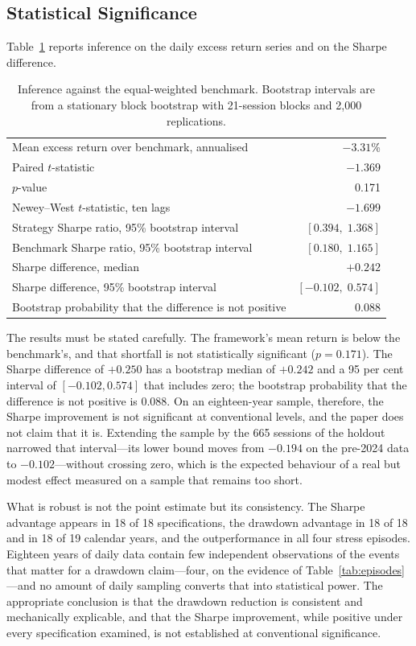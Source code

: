 \subsection{Statistical Significance}

Table~\ref{tab:inference} reports inference on the daily excess return series and on the Sharpe
difference.

\begin{table}[!ht]
\centering
\caption{Inference against the equal-weighted benchmark. Bootstrap intervals are from a
stationary block bootstrap with 21-session blocks and 2{,}000 replications.}
\label{tab:inference}
\small
\begin{tabular}{p{6.4cm}r}
\hline
Mean excess return over benchmark, annualised & $-3.31$\% \\
Paired $t$-statistic & $-1.369$ \\
$p$-value & 0.171 \\
Newey--West $t$-statistic, ten lags & $-1.699$ \\
\hline
Strategy Sharpe ratio, 95\% bootstrap interval & $[0.394, \; 1.368]$ \\
Benchmark Sharpe ratio, 95\% bootstrap interval & $[0.180, \; 1.165]$ \\
Sharpe difference, median & $+0.242$ \\
Sharpe difference, 95\% bootstrap interval & $[-0.102, \; 0.574]$ \\
Bootstrap probability that the difference is not positive & 0.088 \\
\hline
\end{tabular}
\end{table}

The results must be stated carefully. The framework's mean return is below the
benchmark's, and that shortfall is not statistically significant ($p = 0.171$). The
Sharpe difference of $+0.250$ has a bootstrap median of $+0.242$ and a 95 per cent
interval of $[-0.102, 0.574]$ that includes zero; the bootstrap probability that the
difference is not positive is 0.088. On an eighteen-year sample, therefore, the Sharpe
improvement is not significant at conventional levels, and the paper does not claim
that it is. Extending the sample by the 665 sessions of the holdout narrowed that
interval---its lower bound moves from $-0.194$ on the pre-2024 data to $-0.102$---without
crossing zero, which is the expected behaviour of a real but modest effect measured on
a sample that remains too short.

What is robust is not the point estimate but its consistency. The Sharpe advantage
appears in 18 of 18 specifications, the drawdown advantage in 18 of 18 and in 18 of 19
calendar years, and the outperformance in all four stress episodes. Eighteen years of
daily data contain few independent observations of the events that matter for a
drawdown claim---four, on the evidence of Table~\ref{tab:episodes}---and no amount of daily
sampling converts that into statistical power. The appropriate conclusion is that the
drawdown reduction is consistent and mechanically explicable, and that the Sharpe
improvement, while positive under every specification examined, is not established at
conventional significance.

